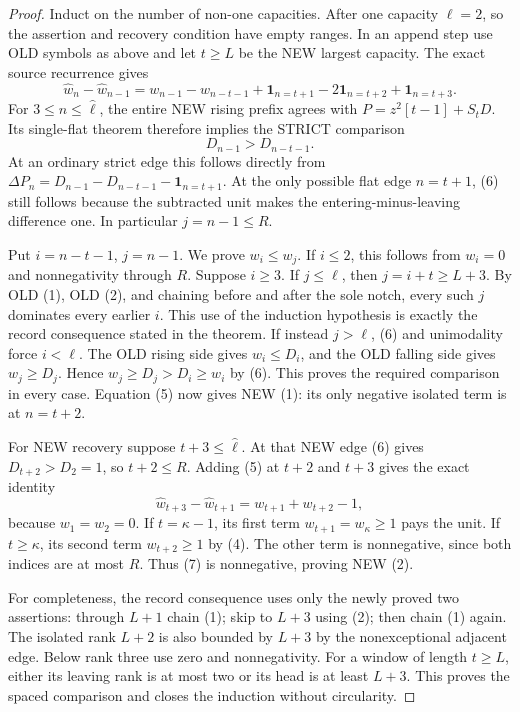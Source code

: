 \begin{proof}
Induct on the number of non-one capacities. After one capacity
$\ell=2$, so the assertion and recovery condition have empty ranges.
In an append step use OLD symbols as above and let $t\ge L$ be the
NEW largest capacity. The exact source recurrence gives
\[
 \widehat w_n-\widehat w_{n-1}
     =w_{n-1}-w_{n-t-1}
       +\mathbf1_{n=t+1}-2\mathbf1_{n=t+2}
                                 +\mathbf1_{n=t+3}.     \tag{5}
\]
For $3\le n\le\widehat\ell$, the entire NEW rising prefix agrees
with $P=z^2[t-1]+S_tD$. Its single-flat theorem therefore implies
the STRICT comparison
\[
                         D_{n-1}>D_{n-t-1}.            \tag{6}
\]
At an ordinary strict edge this follows directly from
$\Delta P_n=D_{n-1}-D_{n-t-1}-\mathbf1_{n=t+1}$.
At the only possible flat edge $n=t+1$, (6) still follows because
the subtracted unit makes the entering-minus-leaving difference one.
In particular $j=n-1\le R$.

Put $i=n-t-1$, $j=n-1$. We prove $w_i\le w_j$.
If $i\le2$, this follows from $w_i=0$ and nonnegativity through $R$.
Suppose $i\ge3$. If $j\le\ell$, then $j=i+t\ge L+3$.
By OLD (1), OLD (2), and chaining before and after the sole notch,
every such $j$ dominates every earlier $i$. This use of the induction
hypothesis is exactly the record consequence stated in the theorem.
If instead $j>\ell$, (6) and unimodality force $i<\ell$.
The OLD rising side gives $w_i\le D_i$, and the OLD falling side gives
$w_j\ge D_j$. Hence $w_j\ge D_j>D_i\ge w_i$ by (6).
This proves the required comparison in every case. Equation (5) now
gives NEW (1): its only negative isolated term is at $n=t+2$.

For NEW recovery suppose $t+3\le\widehat\ell$. At that NEW edge
(6) gives $D_{t+2}>D_2=1$, so $t+2\le R$.
Adding (5) at $t+2$ and $t+3$ gives the exact identity
\[
             \widehat w_{t+3}-\widehat w_{t+1}
                              =w_{t+1}+w_{t+2}-1,       \tag{7}
\]
because $w_1=w_2=0$. If $t=\kappa-1$, its first term
$w_{t+1}=w_\kappa\ge1$ pays the unit. If $t\ge\kappa$,
its second term $w_{t+2}\ge1$ by (4). The other term is
nonnegative, since both indices are at most $R$. Thus (7) is
nonnegative, proving NEW (2).

For completeness, the record consequence uses only the newly proved
two assertions: through $L+1$ chain (1); skip to $L+3$ using (2);
then chain (1) again. The isolated rank $L+2$ is also bounded by
$L+3$ by the nonexceptional adjacent edge. Below rank three use zero
and nonnegativity. For a window of length $t\ge L$, either its leaving
rank is at most two or its head is at least $L+3$. This proves the
spaced comparison and closes the induction without circularity.
\end{proof}


